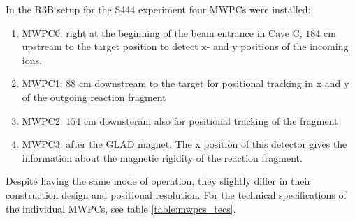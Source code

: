 In the R3B setup for the S444 experiment four MWPCs were installed:\newline
\begin{enumerate}
\item MWPC0: right at the beginning of the beam entrance in Cave C, $184$ cm upstream to the target position to detect x- and y positions of the incoming ions.
\item MWPC1: $88$ cm downstream to the target for positional tracking in x and y of the outgoing reaction fragment
\item MWPC2: $154$ cm downsteram also for positional tracking of the fragment
\item MWPC3: after the GLAD magnet. The x position of this detector gives the information about the magnetic rigidity of the reaction fragment.  %
\end{enumerate}
Despite having the same mode of operation, they slightly differ in their construction design and positional resolution. For the technical specifications of the individual MWPCs, see table \ref{table:mwpcs_tecs}.
